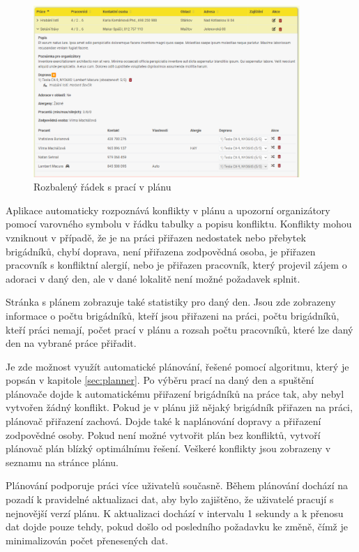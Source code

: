 \begin{figure}[H]
    \centering
    \includegraphics[width=0.9\textwidth]{chapters/images/plan-expanded.pdf}
    \caption{Rozbalený řádek s prací v plánu}
    \label{fig:plan-expanded}
\end{figure}


Aplikace automaticky rozpoznává konflikty v plánu a upozorní organizátory pomocí varovného symbolu v řádku tabulky a popisu konfliktu.
Konflikty mohou vzniknout v případě, že je na práci přiřazen nedostatek nebo přebytek brigádníků, 
chybí doprava, není přiřazena zodpovědná osoba, je přiřazen pracovník s konfliktní alergií, nebo je přiřazen pracovník, který projevil zájem o adoraci v daný den,
ale v dané lokalitě není možné požadavek splnit.

Stránka s plánem zobrazuje také statistiky pro daný den. Jsou zde zobrazeny informace o počtu brigádníků, kteří jsou přiřazeni na práci, počtu brigádníků, kteří
práci nemají, počet prací v plánu a rozsah počtu pracovníků, které lze daný den na vybrané práce přiřadit.

Je zde možnost využít automatické plánování, řešené pomocí algoritmu, který je popsán v kapitole \ref{sec:planner}. Po výběru prací na daný den a spuštění
plánovače dojde k automatickému přiřazení brigádníků na práce tak, aby nebyl vytvořen žádný konflikt. Pokud je v plánu již nějaký brigádník přiřazen na práci, 
plánovač přiřazení zachová. Dojde také k naplánování dopravy a přiřazení zodpovědné osoby. Pokud není možné vytvořit plán bez konfliktů, 
vytvoří plánovač plán blízký optimálnímu řešení. Veškeré konflikty jsou zobrazeny v seznamu na stránce plánu.

Plánování podporuje práci více uživatelů současně. Během plánování dochází na pozadí k pravidelné aktualizaci dat, aby bylo zajištěno,
že uživatelé pracují s nejnovější verzí plánu. K aktualizaci dochází v intervalu 1 sekundy a k přenosu dat dojde pouze tehdy, pokud došlo od posledního požadavku ke změně,
čímž je minimalizován počet přenesených dat.

